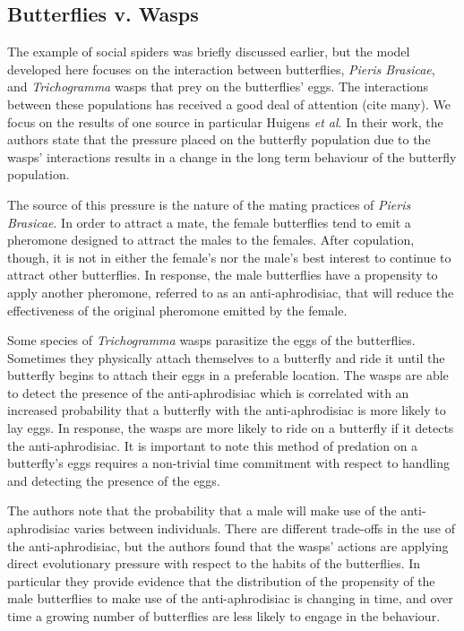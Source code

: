\documentclass[12pt]{article}
\begin{document}
\subsection{Butterflies v. Wasps}
\label{butterflyVWasps}

The example of social spiders was briefly discussed earlier, but the
model developed here focuses on the interaction between butterflies,
\textit{Pieris Brasicae}, and \textit{Trichogramma} wasps that prey on
the butterflies' eggs. The interactions between these populations has
received a good deal of attention (cite many). We focus on the results
of one source in particular Huigens \textit{et
  al}\cite{10.1093/beheco/arq007}. In their work, the authors state
that the pressure placed on the butterfly population due to the wasps'
interactions results in a change in the long term behaviour of the
butterfly population.

The source of this pressure is the nature of the mating practices of
\textit{Pieris Brasicae}. In order to attract a mate, the female
butterflies tend to emit a pheromone designed to attract the males to
the females. After copulation, though, it is not in either the
female's nor the male's best interest to continue to attract other
butterflies. In response, the male butterflies have a propensity to
apply another pheromone, referred to as an anti-aphrodisiac, that will
reduce the effectiveness of the original pheromone emitted by the
female.

Some species of \textit{Trichogramma} wasps parasitize the eggs of the
butterflies. Sometimes they physically attach themselves to a
butterfly and ride it until the butterfly begins to attach their eggs
in a preferable location. The wasps are able to detect the presence of
the anti-aphrodisiac which is correlated with an increased probability
that a butterfly with the anti-aphrodisiac is more likely to lay
eggs. In response, the wasps are more likely to ride on a butterfly if
it detects the anti-aphrodisiac. It is important to note this method
of predation on a butterfly's eggs requires a non-trivial time
commitment with respect to handling and detecting the presence of the
eggs.

The authors\cite{10.1093/beheco/arq007} note that the probability that
a male will make use of the anti-aphrodisiac varies between
individuals. There are different trade-offs in the use of the
anti-aphrodisiac, but the authors found that the wasps' actions are
applying direct evolutionary pressure with respect to the habits of
the butterflies. In particular they provide evidence that the
distribution of the propensity of the male butterflies to make use of
the anti-aphrodisiac is changing in time, and over time a growing
number of butterflies are less likely to engage in the behaviour.
\end{document}
